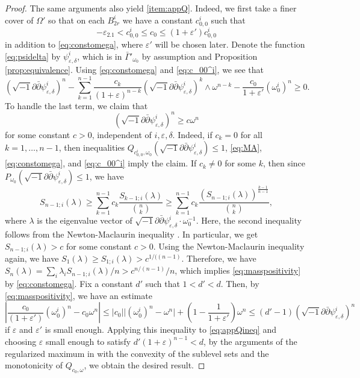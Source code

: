 \documentclass{amsart}
\numberwithin{equation}{section}
\theoremstyle{plain}
\theoremstyle{definition}
\theoremstyle{remark}
\newcommand{\delb}{\sqrt{-1}\partial\bar{\partial}}
\begin{document}
\begin{proof}
   The same arguments also yield \ref{item:appQ}. Indeed, we first take a finer cover of $\Omega'$ so that on each $B^i_{2r}$ we have a constant $c_{0,0}^i$ such that
   \begin{equation}\label{eq:c_00^i}
       -\varepsilon_{2.1}<c_{0,0}^i\le c_0\le (1+\varepsilon')c_{0,0}^i
   \end{equation}
   in addition to \eqref{eq:constomega}, where $\varepsilon'$ will be chosen later. Denote the function \eqref{eq:psidelta} by $\psi_{\varepsilon,\delta}^i$, which is in $\bar{\Gamma}'_{\omega_0}$ by assumption and Proposition \ref{prop:equivalence}. Using \eqref{eq:constomega} and \eqref{eq:c_00^i}, we see that
   \begin{equation}\label{eq:appQineq}
       (\delb\psi^i_{\varepsilon,\delta})^n-\sum_{k=1}^{n-1}\frac{c_k}{(1+\varepsilon)^{n-k}}(\delb\psi^i_{\varepsilon,\delta})^{k}\wedge\omega^{n-k}-\frac{c_0}{1+\varepsilon'}(\omega_0^i)^n\ge0.
   \end{equation}
   To handle the last term, we claim that
   \begin{equation}\label{eq:masspositivity}
        (\delb \psi^i_{\varepsilon,\delta})^n\ge c\omega^n
    \end{equation}
    for some constant $c>0$, independent of $i,\varepsilon,\delta$. Indeed, if $c_k=0$ for all $k=1,\dots,n-1$, then inequalities $Q_{c_{0,0}^i,\omega_0}(\delb\psi_{\varepsilon,\delta}^i)\le 1$, \eqref{eq:MA}, \eqref{eq:constomega}, and \eqref{eq:c_00^i} imply the claim. If 
    $c_k\neq0$ for some $k$, then since $P_{\omega_0}(\delb \psi^i_{\varepsilon,\delta})\le 1$, we have
    \begin{equation*}
         S_{n-1;i}(\lambda)\ge\sum_{k=1}^{n-1}c_k \frac{S_{k-1;i}(\lambda)}{{n\choose k}}\ge\sum_{k=1}^{n-1}c_k \frac{(S_{n-1;i}(\lambda))^{\frac{k-1}{n-1}}}{{n\choose k}},
    \end{equation*}
    where $\lambda$ is the eigenvalue vector of $\delb \psi^i_{\varepsilon,\delta}\cdot\omega_0^{-1}$. Here, the second inequality follows from the Newton-Maclaurin inequality \cite[Lemma 2.10]{Spr}. 
    In particular, we get $S_{n-1;i}(\lambda)>c$ for some constant $c>0$. Using the Newton-Maclaurin inequality again, we have $S_1(\lambda)\ge S_{1;i}(\lambda)>c^{1/{((n-1)}}$. Therefore, we have $S_n(\lambda)=\sum_i\lambda_i S_{n-1;i}(\lambda)/n>c^{n/(n-1)}/n$, which implies \eqref{eq:masspositivity} by \eqref{eq:constomega}. 
    Fix a constant $d'$ such that $1<d'<d$.
   Then, by \eqref{eq:masspositivity}, we have an estimate
    $$\left\vert \frac{c_0}{(1+\varepsilon')}(\omega_0^i)^n-c_0\omega^n\right\vert\le\vert c_0\vert\vert(\omega^i_0)^n-\omega^n\vert+\left(1-\frac{1}{1+\varepsilon'}\right)\omega^n\le (d'-1)(\delb\psi^i_{\varepsilon,\delta})^n$$
   if $\varepsilon$ and $\varepsilon'$ is small enough. 
   Applying this inequality to \eqref{eq:appQineq} and choosing $\varepsilon$ small enough to satisfy $d'(1+\varepsilon)^{n-1}<d$, by the arguments of the regularized maximum in \cite[p561--562]{GChen} with the convexity of the sublevel sets and the monotonicity of $Q_{c_0,\omega}$, we obtain the desired result.
\end{proof}
\end{document}
